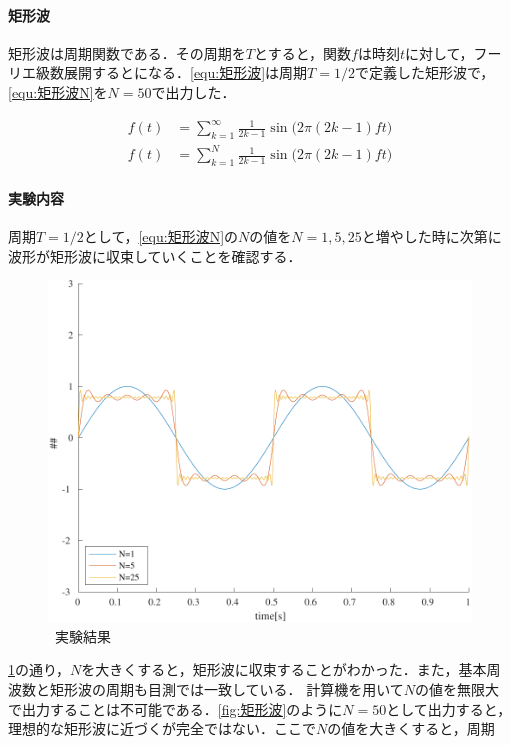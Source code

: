 \paragraph{矩形波}
矩形波は周期関数である．その周期を\(T\)とすると，関数\(f\)は時刻\(t\)に対して，フーリエ級数展開するとになる．\eqref{equ:矩形波}は周期\(T=1/2\)で定義した矩形波で，\eqref{equ:矩形波N}を\(N=50\)で出力した．\par
\begin{align}
    f(t) & =\sum_{k=1}^{\infty}\frac{1}{2k-1}\sin\big(2\pi(2k-1)ft\big)\label{equ:矩形波} \\
    f(t) & =\sum_{k=1}^{N}\frac{1}{2k-1}\sin\big(2\pi(2k-1)ft\big)\label{equ:矩形波N}
\end{align}
\paragraph{実験内容}周期\(T=1/2\)として，\eqref{equ:矩形波N}の\(N\)の値を\(N=1, 5, 25\)と増やした時に次第に波形が矩形波に収束していくことを確認する．
\result
\begin{figure}
    \centering
    \caption{\kadaiad\ 実験結果}
    \label{fig:\kadaiae_実験結果}
    \includegraphics[keepaspectratio,width=.3\textwidth]{../../Figures/01_04_2.pdf}
\end{figure}
\ref{fig:\kadaiae_実験結果}の通り，\(N\)を大きくすると，矩形波に収束することがわかった．また，基本周波数と矩形波の周期も目測では一致している．
\consideration
計算機を用いて\(N\)の値を無限大で出力することは不可能である．\ref{fig:矩形波}のように\(N=50\)として出力すると，理想的な矩形波に近づくが完全ではない．ここで\(N\)の値を大きくすると，周期
\section{\kadaiae}
\purpose
